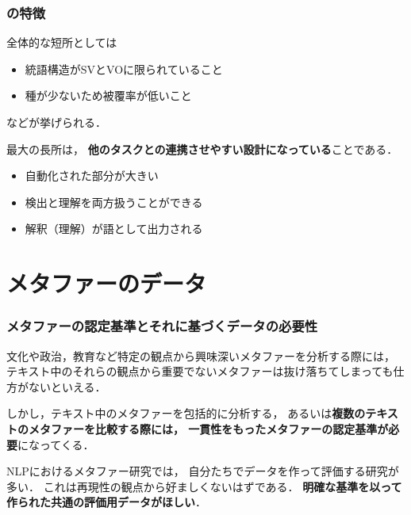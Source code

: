 \documentclass[11pt]{beamer}
\let\oldcite=\citet
\renewcommand\citet[1]{\hyperlink{#1}{\oldcite{#1}}}
\begin{document}
\begin{frame}
\frametitle{\citet{shutova2013}の特徴}
全体的な短所としては
\begin{itemize}
    \item 統語構造がSVとVOに限られていること
    \item 種が少ないため被覆率が低いこと
\end{itemize}
などが挙げられる．

\bigskip

最大の長所は，
\textbf{他のタスクとの連携させやすい設計になっている}ことである．
\begin{itemize}
    \item 自動化された部分が大きい

    \item 検出と理解を両方扱うことができる

    \item 解釈（理解）が語として出力される
\end{itemize}
\end{frame}

\section{メタファーのデータ}

\begin{frame}
    \frametitle{メタファーの認定基準とそれに基づくデータの必要性}


    文化や政治，教育など特定の観点から興味深いメタファーを分析する際には，
    テキスト中のそれらの観点から重要でないメタファーは抜け落ちてしまっても仕方がないといえる．

    しかし，テキスト中のメタファーを包括的に分析する，
    あるいは\textbf{複数のテキストのメタファーを比較する際には，
    一貫性をもったメタファーの認定基準が必要}になってくる．

    \bigskip

    NLPにおけるメタファー研究では，
    自分たちでデータを作って評価する研究が多い．
    これは再現性の観点から好ましくないはずである．
    \textbf{明確な基準を以って作られた共通の評価用データがほしい}．
\end{frame}
\end{document}
